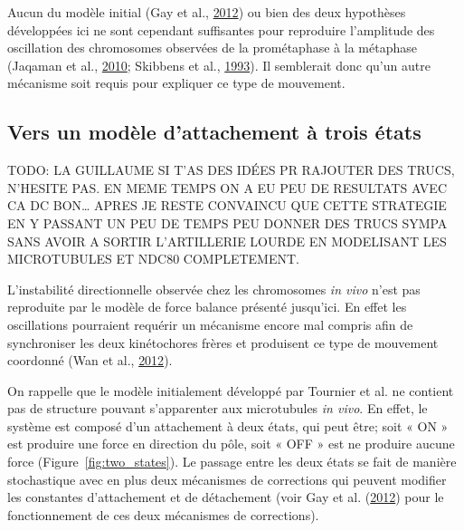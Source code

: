 \documentclass[12pt,a4paper,twoside,openright]{book}
\begin{document}
Aucun du modèle initial (Gay et al., \hyperref[ref-Gay2012a]{2012}) ou
bien des deux hypothèses développées ici ne sont cependant suffisantes
pour reproduire l'amplitude des oscillation des chromosomes observées de
la prométaphase à la métaphase (Jaqaman et al.,
\hyperref[ref-Jaqaman2010]{2010}; Skibbens et al.,
\hyperref[ref-Skibbens1993]{1993}). Il semblerait donc qu'un autre
mécanisme soit requis pour expliquer ce type de mouvement.

\subsection{Vers un modèle d'attachement à trois
états}\label{vers-un-moduxe8le-dattachement-uxe0-trois-uxe9tats}

TODO: LA GUILLAUME SI T'AS DES IDÉES PR RAJOUTER DES TRUCS, N'HESITE
PAS. EN MEME TEMPS ON A EU PEU DE RESULTATS AVEC CA DC BON\ldots{} APRES
JE RESTE CONVAINCU QUE CETTE STRATEGIE EN Y PASSANT UN PEU DE TEMPS PEU
DONNER DES TRUCS SYMPA SANS AVOIR A SORTIR L'ARTILLERIE LOURDE EN
MODELISANT LES MICROTUBULES ET NDC80 COMPLETEMENT.

L'instabilité directionnelle observée chez les chromosomes \emph{in
vivo} n'est pas reproduite par le modèle de force balance présenté
jusqu'ici. En effet les oscillations pourraient requérir un mécanisme
encore mal compris afin de synchroniser les deux kinétochores frères et
produisent ce type de mouvement coordonné (Wan et al.,
\hyperref[ref-Wan2012]{2012}).

On rappelle que le modèle initialement développé par Tournier et al. ne
contient pas de structure pouvant s'apparenter aux microtubules \emph{in
vivo}. En effet, le système est composé d'un attachement à deux états,
qui peut être; soit « ON » est produire une force en direction du pôle,
soit « OFF » est ne produire aucune force (Figure~\ref{fig:two_states}).
Le passage entre les deux états se fait de manière stochastique avec en
plus deux mécanismes de corrections qui peuvent modifier les constantes
d'attachement et de détachement (voir Gay et al.
(\hyperref[ref-Gay2012a]{2012}) pour le fonctionnement de ces deux
mécanismes de corrections).
\end{document}
